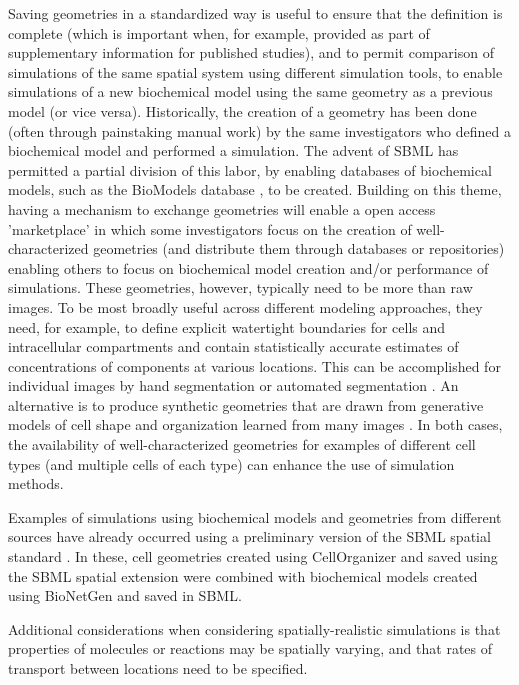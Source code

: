 Saving geometries in a standardized way is useful to ensure that the definition is complete (which is important when, for example, provided as part of supplementary information for published studies), and to permit comparison of simulations of the same spatial system using different simulation tools, to enable simulations of a new biochemical model using the same geometry as a previous model (or vice versa). Historically, the creation of a geometry has been done (often through painstaking manual work) by the same investigators who defined a biochemical model and performed a simulation. The advent of SBML has permitted a partial division of this labor, by enabling databases of biochemical models, such as the BioModels database \citep{lenovere:2006, li:2010}, to be created. Building on this theme, having a mechanism to exchange geometries will enable a open access 'marketplace' in which some investigators focus on the creation of well-characterized geometries (and distribute them through databases or repositories) enabling others to focus on biochemical model creation and/or performance of simulations. These geometries, however, typically need to be more than raw images. To be most broadly useful across different modeling approaches, they need, for example, to define explicit watertight boundaries for cells and intracellular compartments and contain statistically accurate estimates of concentrations of components at various locations. This can be accomplished for individual images by hand segmentation \citep{loew:2001} or automated segmentation \citep{perez:2014}. An alternative is to produce synthetic geometries that are drawn from generative models of cell shape and organization learned from many images \citep{zhao:2007}. In both cases, the availability of well-characterized geometries for examples of different cell types (and multiple cells of each type) can enhance the use of simulation methods.

Examples of simulations using biochemical models and geometries from different sources have already occurred using a preliminary version of the SBML spatial standard \citep{sullivan:2015, donovan:2016}. In these, cell geometries created using CellOrganizer and saved using the SBML spatial extension were combined with biochemical models created using BioNetGen and saved in SBML.

Additional considerations when considering spatially-realistic simulations is that properties of molecules or reactions may be spatially varying, and that rates of transport between locations need to be specified.

